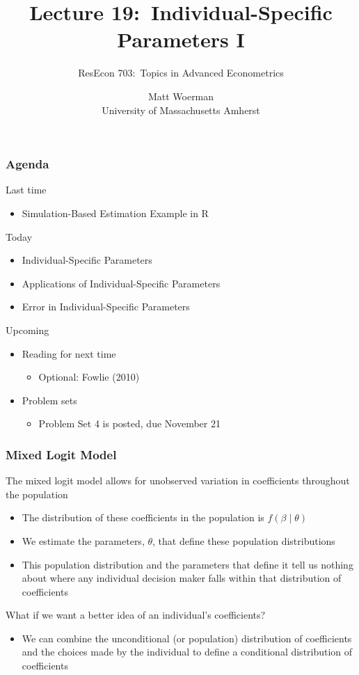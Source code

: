 \documentclass{beamer}
\title[Lecture 19:\ Individual-Specific Parameters I]{Lecture 19:\ Individual-Specific Parameters I}
\author[ResEcon 703:\ Advanced Econometrics]{ResEcon 703:\ Topics in Advanced Econometrics}
\date{Matt Woerman\\University of Massachusetts Amherst}
\begin{document}
{ 
\begin{frame}[noframenumbering]
    \titlepage
\end{frame}
}

\begin{frame}\frametitle{Agenda}
    Last time
    \begin{itemize}
        \item Simulation-Based Estimation Example in R
    \end{itemize}
    \vspace{2ex}
    Today
    \begin{itemize}
    	\item Individual-Specific Parameters
    	\item Applications of Individual-Specific Parameters
    	\item Error in Individual-Specific Parameters
    \end{itemize}
    \vspace{2ex}
    Upcoming
    \begin{itemize}
        \item Reading for next time
        \begin{itemize}
            \item Optional: Fowlie (2010)
        \end{itemize}
        \item Problem sets
        \begin{itemize}
            \item Problem Set 4 is posted, due November 21
        \end{itemize}
    \end{itemize}
\end{frame}

\begin{frame}\frametitle{Mixed Logit Model}
    The mixed logit model allows for unobserved variation in coefficients throughout the population
    \begin{itemize}
        \item The distribution of these coefficients in the population is $f(\beta \mid \theta)$
        \item We estimate the parameters, $\theta$, that define these population distributions
        \item This population distribution and the parameters that define it tell us nothing about where any individual decision maker falls within that distribution of coefficients
    \end{itemize}
    \vspace{3ex}
    What if we want a better idea of an individual's coefficients?
    \begin{itemize}
        \item We can combine the unconditional (or population) distribution of coefficients and the choices made by the individual to define a conditional distribution of coefficients
    \end{itemize}
\end{frame}
\end{document}
